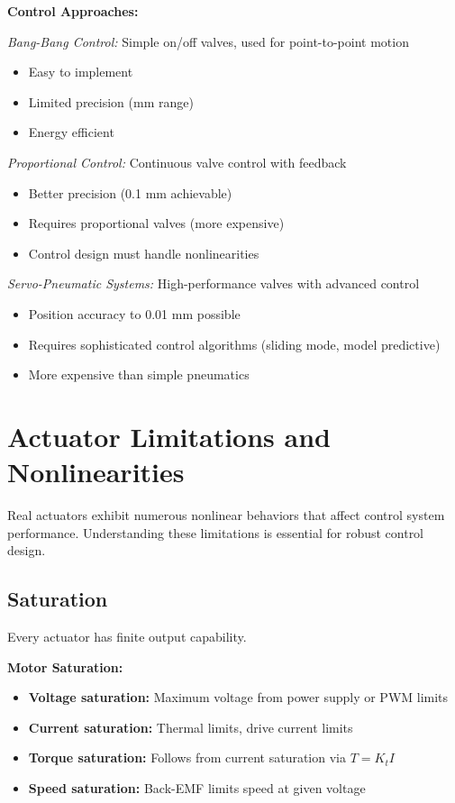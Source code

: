 \textbf{Control Approaches:}

\textit{Bang-Bang Control:} Simple on/off valves, used for point-to-point motion
\begin{itemize}
    \item Easy to implement
    \item Limited precision (mm range)
    \item Energy efficient
\end{itemize}

\textit{Proportional Control:} Continuous valve control with feedback
\begin{itemize}
    \item Better precision (0.1 mm achievable)
    \item Requires proportional valves (more expensive)
    \item Control design must handle nonlinearities
\end{itemize}

\textit{Servo-Pneumatic Systems:} High-performance valves with advanced control
\begin{itemize}
    \item Position accuracy to 0.01 mm possible
    \item Requires sophisticated control algorithms (sliding mode, model predictive)
    \item More expensive than simple pneumatics
\end{itemize}

\section{Actuator Limitations and Nonlinearities}
\label{sec:actuator_limitations}

Real actuators exhibit numerous nonlinear behaviors that affect control system performance. Understanding these limitations is essential for robust control design.

\subsection{Saturation}

Every actuator has finite output capability.

\textbf{Motor Saturation:}
\begin{itemize}
    \item \textbf{Voltage saturation:} Maximum voltage from power supply or PWM limits
    \item \textbf{Current saturation:} Thermal limits, drive current limits
    \item \textbf{Torque saturation:} Follows from current saturation via $T = K_t I$
    \item \textbf{Speed saturation:} Back-EMF limits speed at given voltage
\end{itemize}

